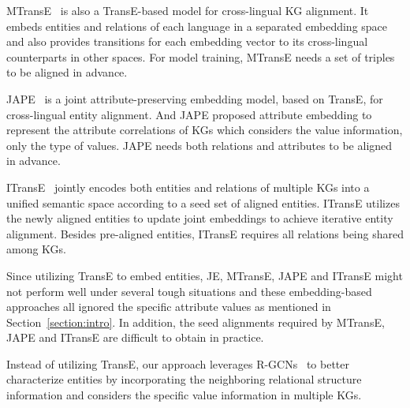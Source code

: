 	MTransE~\cite{chen2016multilingual} is also a TransE-based model for cross-lingual KG alignment. It embeds entities and relations of each language in a separated embedding space and also provides transitions for each embedding vector to its cross-lingual counterparts in other spaces. For model training, MTransE needs a set of triples to be aligned in advance.
	
	JAPE~\cite{sun2017cross} is a joint attribute-preserving embedding model, based on TransE, for cross-lingual entity alignment. And JAPE proposed attribute embedding to represent the attribute correlations of KGs which considers the value information, only the type of values. JAPE needs both relations and attributes to be aligned in advance.
	
	ITransE~\cite{zhu2017iterative} jointly encodes both entities and relations of multiple KGs into a unified semantic space according to a seed set of aligned entities. ITransE utilizes the newly aligned entities to update joint embeddings to achieve iterative entity alignment. Besides pre-aligned entities, ITransE requires all relations being shared among KGs.
	
	Since utilizing TransE to embed entities, JE, MTransE, JAPE and ITransE might not perform well under several tough situations and these embedding-based approaches all ignored the specific attribute values as mentioned in Section~\ref{section:intro}. In addition, the seed alignments required by MTransE, JAPE and ITransE are difficult to obtain in practice.
	
	Instead of utilizing TransE, our approach leverages R-GCNs~\cite{Schlichtkrull2017Modeling} to better characterize entities by incorporating the neighboring relational structure information and considers the specific value information in multiple KGs.
